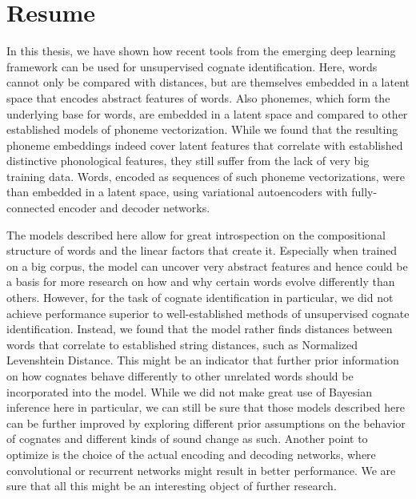 \documentclass[6pt]{article}
\begin{document}
\section{Resume}
\label{Resume}
In this thesis, we have shown how recent tools from the emerging deep learning framework can be used for unsupervised cognate identification. Here, words cannot only be compared with distances, but are themselves embedded in a latent space that encodes abstract features of words. Also phonemes, which form the underlying base for words, are embedded in a latent space and compared to other established models of phoneme vectorization. While we found that the resulting phoneme embeddings indeed cover latent features that correlate with established distinctive phonological features, they still suffer from the lack of very big training data. Words, encoded as sequences of such phoneme vectorizations, were than embedded in a latent space, using variational autoencoders with fully-connected encoder and decoder networks. 

The models described here allow for great introspection on the compositional structure of words and the linear factors that create it. Especially when trained on a big corpus, the model can uncover very abstract features and hence could be a basis for more research on how and why certain words evolve differently than others. However, for the task of cognate identification in particular, we did not achieve performance superior to well-established methods of unsupervised cognate identification. Instead, we found that the model rather finds distances between words that correlate to established string distances, such as Normalized Levenshtein Distance. This might be an indicator that further prior information on how cognates behave differently to other unrelated words should be incorporated into the model.  While we did not make great use of Bayesian inference here in particular, we can still be sure that those models described here can be further improved by exploring different prior assumptions on the behavior of cognates and different kinds of sound change as such. Another point to optimize is the choice of the actual encoding and decoding networks, where convolutional or recurrent networks might result in better performance. We are sure that all this might be an interesting object of further research. 
\end{document}
